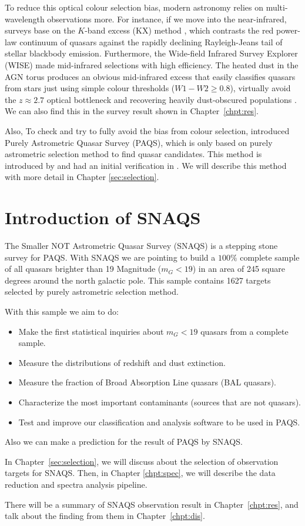 To reduce this optical colour selection bias, modern astronomy relies on multi-wavelength observations more. For instance, if we move into the near-infrared, surveys base on the $K$-band excess (KX) method \citep{maddoxLargeAreaKX2012}, which contrasts the red power-law continuum of quasars against the rapidly declining Rayleigh-Jeans tail of stellar blackbody emission. Furthermore, the Wide-field Infrared Survey Explorer (WISE) made mid-infrared selections with high efficiency. The heated dust in the AGN torus produces an obvious mid-infrared excess that easily classifies quasars from stars just using simple colour thresholds ($W1 - W2 \ge 0.8$), virtually avoid the $z \approx 2.7$ optical bottleneck and recovering heavily dust-obscured populations \citep{2012ApJ...753...30S,2013ApJ...772...26A}. We can also find this in the survey result shown in Chapter~\ref{chpt:res}.

Also, To check and try to fully avoid the bias from colour selection, \citet{krogager_4mostgaia_2023} introduced Purely Astrometric Quasar Survey (PAQS), which is only based on purely astrometric selection method to find quasar candidates. This method is introduced by \citet{heintz_study_2015} and had an initial verification in \citet{heintz_spectroscopic_2020}. We will describe this method with more detail in Chapter \ref{sec:selection}.

\section{Introduction of SNAQS}

The Smaller  NOT  Astrometric  Quasar  Survey  (SNAQS) is a stepping stone survey for PAQS. With SNAQS we are pointing to build a $100\%$ complete sample of all quasars brighter than 19 Magnitude ($m_G<19$) in an area of 245 square degrees around the north galactic pole. This sample contains 1627 targets selected by purely astrometric selection method.

With this sample we aim to do:
\begin{itemize}
    \item Make the first statistical inquiries about $m_G<19$ quasars from a complete sample. 
    \item Measure the distributions of redshift and dust extinction.
    \item Measure the fraction of Broad Absorption Line quasars (BAL quasars).
    \item Characterize the most important contaminants (sources that are not quasars).
    \item Test and improve our classification and analysis software to be used in PAQS.
\end{itemize}

Also we can make a prediction for the result of PAQS by SNAQS. 

In Chapter~\ref{sec:selection}, we will discuss about the selection of observation targets for SNAQS. Then, in Chapter \ref{chpt:spec}, we will describe the data reduction and spectra analysis pipeline.

There will be a summary of SNAQS observation result in Chapter~\ref{chpt:res}, and talk about the finding from them in Chapter~\ref{chpt:dis}.
